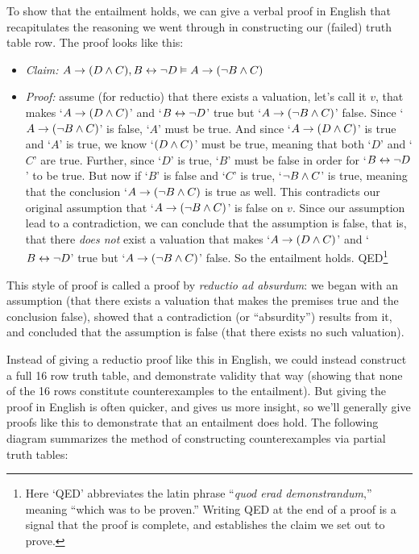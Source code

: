 To show that the entailment holds, we can give a verbal proof in English that recapitulates the reasoning we went through in constructing our (failed) truth table row. The proof looks like this:

\begin{itemize}
\item[] \emph{Claim:} $A \rightarrow (D \wedge C), B \leftrightarrow \neg D \vDash A \rightarrow (\neg B \wedge C)$
\item[] \emph{Proof:} assume (for reductio) that there exists a valuation, let's call it $v$, that makes `$A \rightarrow (D \wedge C)$' and  `$B \leftrightarrow \neg D$' true but  `$A \rightarrow (\neg B \wedge C)$' false.  Since  `$A \rightarrow (\neg B \wedge C)$'  is false, `$A$' must be true.  And since `$A \rightarrow (D \wedge C)$' is true and `$A$' is true, we know `$(D\wedge C)$' must be true, meaning that both `$D$' and `$C$' are true.  Further, since `$D$' is true, `$B$' must be false in order for `$B \leftrightarrow \neg D$' to be true.  But now if `$B$' is false and `$C$' is true, `$\neg B \wedge C$' is true, meaning that the conclusion `$A \rightarrow (\neg B \wedge C)$ is true as well.  This contradicts our original assumption that  `$A \rightarrow (\neg B \wedge C)$' is false on $v$.  Since our assumption lead to a contradiction, we can conclude that the assumption is false, that is, that there \emph{does not} exist a valuation that makes `$A \rightarrow (D \wedge C)$' and  `$B \leftrightarrow \neg D$' true but  `$A \rightarrow (\neg B \wedge C)$' false.  So the entailment holds. \hfill QED\footnote{Here `QED' abbreviates the latin phrase ``\emph{quod erad demonstrandum},'' meaning ``which was to be proven.'' Writing QED at the end of a proof is a signal that the proof is complete, and establishes the claim we set out to prove.}


\end{itemize}
This style of proof is called a proof by \emph{reductio ad absurdum}: we began with an assumption (that there exists a valuation that makes the premises true and the conclusion false), showed that a contradiction (or ``absurdity'')  results from it, and concluded that the assumption is false (that there exists no such valuation).


Instead of giving a reductio proof like this in English, we could instead construct a full 16 row truth table, and demonstrate validity that way (showing that none of the 16 rows constitute counterexamples to the entailment).  But giving the proof in English is often quicker, and gives us more insight, so we'll generally give proofs like this to demonstrate that an entailment does hold.  The following diagram summarizes the method of constructing counterexamples via partial truth tables:

